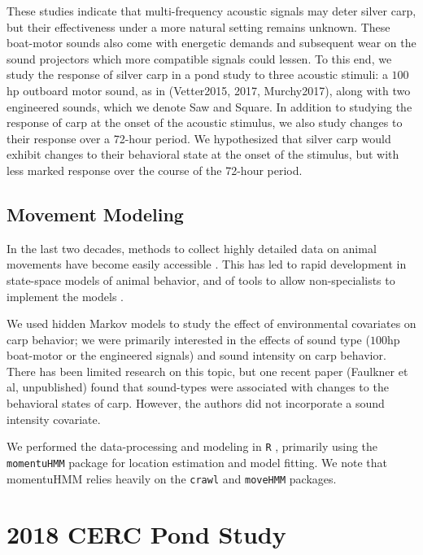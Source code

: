 \documentclass[12pt]{article}
\begin{document}
	These studies indicate that multi-frequency acoustic signals may deter silver carp, but their effectiveness under a more natural setting remains unknown. These boat-motor sounds also come with energetic demands and subsequent wear on the sound projectors which more compatible signals could lessen. To this end, we study the response of silver carp in a pond study to three acoustic stimuli: a $100$hp outboard motor sound, as in (Vetter2015, 2017, Murchy2017), along with two engineered sounds, which we denote Saw and Square. In addition to studying the response of carp at the onset of the acoustic stimulus, we also study changes to their response over a 72-hour period. We hypothesized that silver carp would exhibit changes to their behavioral state at the onset of the stimulus, but with less marked response over the course of the 72-hour period.

	\subsection{Movement Modeling}
	
	In the last two decades, methods to collect highly detailed data on animal movements have become easily accessible \cite{McConnell2010, Tomkiewicz2010}. This has led to rapid development in state-space models of animal behavior, and of tools to allow non-specialists to implement the models \cite{Johnson2008, McClintock2012, Michelot2016, Whoriskey2017, McClintock2018}.
	
	We used hidden Markov models to study the effect of environmental covariates on carp behavior; we were primarily interested in the effects of sound type ($100$hp boat-motor or the engineered signals) and sound intensity on carp behavior. There has been limited research on this topic, but one recent paper (Faulkner et al, unpublished) found that sound-types were associated with changes to the behavioral states of carp. However, the authors did not incorporate a sound intensity covariate.
	
	We performed the data-processing and modeling in \texttt{R} \cite{Rlang2022}, primarily using the \texttt{momentuHMM} package \cite{McClintock2018} for location estimation and model fitting. We note that momentuHMM relies heavily on the \texttt{crawl} \cite{crawl} and \texttt{moveHMM} \cite{Michelot2016} packages.

\section{2018 CERC Pond Study} \label{sec:pond_study}
\end{document}
